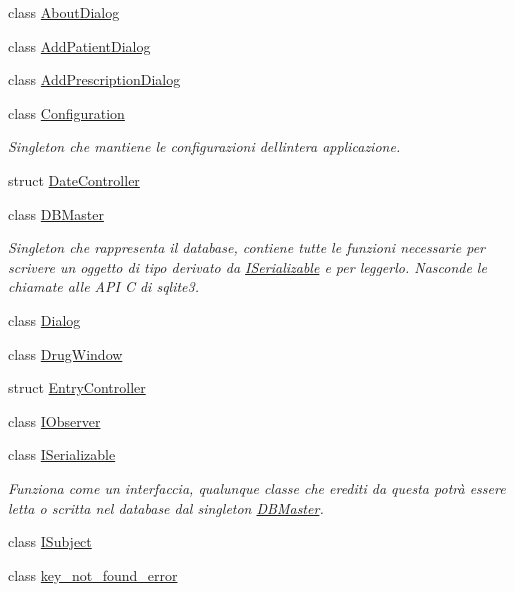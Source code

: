 \begin{DoxyCompactItemize}
\item 
class \mbox{\hyperlink{classmm_1_1_about_dialog}{About\+Dialog}}
\item 
class \mbox{\hyperlink{classmm_1_1_add_patient_dialog}{Add\+Patient\+Dialog}}
\item 
class \mbox{\hyperlink{classmm_1_1_add_prescription_dialog}{Add\+Prescription\+Dialog}}
\item 
class \mbox{\hyperlink{classmm_1_1_configuration}{Configuration}}
\begin{DoxyCompactList}\small\item\em Singleton che mantiene le configurazioni dell\textquotesingle{}intera applicazione. \end{DoxyCompactList}\item 
struct \mbox{\hyperlink{structmm_1_1_date_controller}{Date\+Controller}}
\item 
class \mbox{\hyperlink{classmm_1_1_d_b_master}{D\+B\+Master}}
\begin{DoxyCompactList}\small\item\em Singleton che rappresenta il database, contiene tutte le funzioni necessarie per scrivere un oggetto di tipo derivato da \mbox{\hyperlink{classmm_1_1_i_serializable}{I\+Serializable}} e per leggerlo. Nasconde le chiamate alle A\+PI C di sqlite3. \end{DoxyCompactList}\item 
class \mbox{\hyperlink{classmm_1_1_dialog}{Dialog}}
\item 
class \mbox{\hyperlink{classmm_1_1_drug_window}{Drug\+Window}}
\item 
struct \mbox{\hyperlink{structmm_1_1_entry_controller}{Entry\+Controller}}
\item 
class \mbox{\hyperlink{classmm_1_1_i_observer}{I\+Observer}}
\item 
class \mbox{\hyperlink{classmm_1_1_i_serializable}{I\+Serializable}}
\begin{DoxyCompactList}\small\item\em Funziona come un interfaccia, qualunque classe che erediti da questa potrà essere letta o scritta nel database dal singleton \mbox{\hyperlink{classmm_1_1_d_b_master}{D\+B\+Master}}. \end{DoxyCompactList}\item 
class \mbox{\hyperlink{classmm_1_1_i_subject}{I\+Subject}}
\item 
class \mbox{\hyperlink{classmm_1_1key__not__found__error}{key\+\_\+not\+\_\+found\+\_\+error}}

\end{DoxyCompactItemize}
